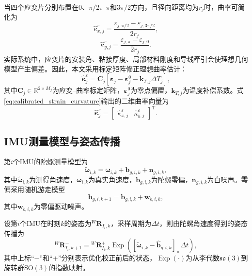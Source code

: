 当四个应变片分别布置在$0$、$\pi/2$、$\pi$和$3\pi/2$方向，且径向距离均为$r_j$时，曲率可简化为
\begin{equation}
    \hat\kappa_{x,j}^{\varepsilon}
    =\frac{\varepsilon_{j,\pi/2}-\varepsilon_{j,3\pi/2}}{2r_j},
    \label{eq:kappa_x_four_gauge}
\end{equation}
\begin{equation}
    \hat\kappa_{y,j}^{\varepsilon}
    =\frac{\varepsilon_{j,\pi}-\varepsilon_{j,0}}{2r_j}.
    \label{eq:kappa_y_four_gauge}
\end{equation}
实际系统中，应变片的安装角、粘接厚度、局部材料刚度和导线牵引会使理想几何模型产生偏差。因此，本文采用标定矩阵修正理想曲率估计：
\begin{equation}
    \hat{\bm\kappa}_{j}^{\varepsilon}
    =\bm C_j
    \left[
    \bm\varepsilon_j-\bm\varepsilon_{j}^{0}
    -\bm k_{T,j}\Delta T_j
    \right],
    \label{eq:calibrated_strain_curvature}
\end{equation}
其中$\bm C_j\in\mathbb R^{2\times M_j}$为应变--曲率标定矩阵，$\bm\varepsilon_j^{0}$为零点偏置，$\bm k_{T,j}$为温度补偿系数。式\eqref{eq:calibrated_strain_curvature}输出的二维曲率向量为
\begin{equation}
    \hat{\bm\kappa}_{j}^{\varepsilon}
    =
    \begin{bmatrix}
        \hat\kappa_{x,j}^{\varepsilon} &
        \hat\kappa_{y,j}^{\varepsilon}
    \end{bmatrix}^{\mathrm T}.
\end{equation}

\subsection{IMU测量模型与姿态传播}

第$i$个IMU的陀螺测量模型为
\begin{equation}
    \tilde{\bm\omega}_{i,k}
    =\bm\omega_{i,k}+\bm b_{g,i,k}+\bm n_{g,i,k},
    \label{eq:gyro_model}
\end{equation}
其中$\tilde{\bm\omega}_{i,k}$为测得角速度，$\bm\omega_{i,k}$为真实角速度，$\bm b_{g,i,k}$为陀螺零偏，$\bm n_{g,i,k}$为白噪声。零偏采用随机游走模型
\begin{equation}
    \bm b_{g,i,k+1}
    =\bm b_{g,i,k}+\bm w_{b,i,k},
    \label{eq:bias_random_walk}
\end{equation}
其中$\bm w_{b,i,k}$为零偏驱动噪声。

设第$i$个IMU在时刻$k$的姿态为${}^{W}\bm R_{I_i,k}$，采样周期为$\Delta t$，则由陀螺角速度得到的姿态传播为
\begin{equation}
    {}^{W}\bm R_{I_i,k+1}^{-}
    ={}^{W}\bm R_{I_i,k}^{+}
    \operatorname{Exp}\left(
    \left[
    \tilde{\bm\omega}_{i,k}-\hat{\bm b}_{g,i,k}
    \right]_{\times}\Delta t
    \right),
    \label{eq:imu_propagation}
\end{equation}
其中上标“$-$”和“$+$”分别表示优化校正前后的状态，$\operatorname{Exp}(\cdot)$为从李代数$\mathfrak{so}(3)$到旋转群$\mathrm{SO}(3)$的指数映射。

